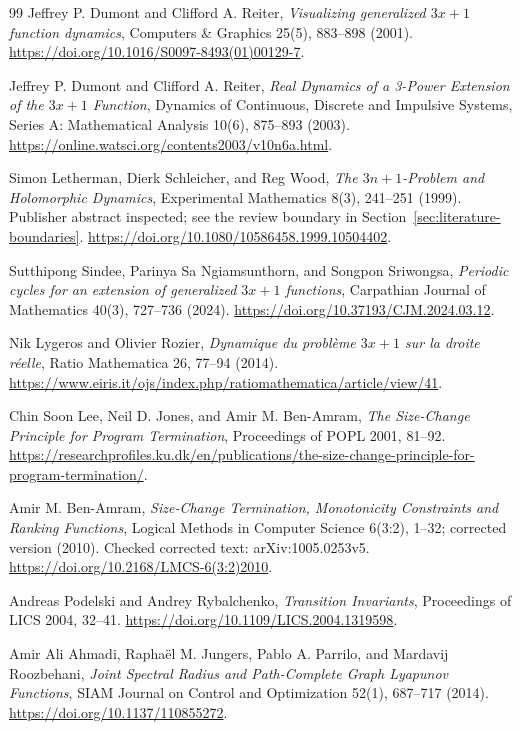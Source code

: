 \begin{thebibliography}{99}
Jeffrey P. Dumont and Clifford A. Reiter,
\emph{Visualizing generalized $3x+1$ function dynamics},
Computers \& Graphics 25(5), 883--898 (2001).
\url{https://doi.org/10.1016/S0097-8493(01)00129-7}.

Jeffrey P. Dumont and Clifford A. Reiter,
\emph{Real Dynamics of a 3-Power Extension of the $3x+1$ Function},
Dynamics of Continuous, Discrete and Impulsive Systems, Series A: Mathematical Analysis 10(6), 875--893 (2003).
\url{https://online.watsci.org/contents2003/v10n6a.html}.

Simon Letherman, Dierk Schleicher, and Reg Wood,
\emph{The $3n+1$-Problem and Holomorphic Dynamics},
Experimental Mathematics 8(3), 241--251 (1999). Publisher abstract inspected; see the review boundary in Section~\ref{sec:literature-boundaries}.
\url{https://doi.org/10.1080/10586458.1999.10504402}.

Sutthipong Sindee, Parinya Sa Ngiamsunthorn, and Songpon Sriwongsa,
\emph{Periodic cycles for an extension of generalized $3x+1$ functions},
Carpathian Journal of Mathematics 40(3), 727--736 (2024).
\url{https://doi.org/10.37193/CJM.2024.03.12}.

Nik Lygeros and Olivier Rozier,
\emph{Dynamique du problème $3x+1$ sur la droite r\'{e}elle},
Ratio Mathematica 26, 77--94 (2014).
\url{https://www.eiris.it/ojs/index.php/ratiomathematica/article/view/41}.

Chin Soon Lee, Neil D. Jones, and Amir M. Ben-Amram,
\emph{The Size-Change Principle for Program Termination},
Proceedings of POPL 2001, 81--92.
\url{https://researchprofiles.ku.dk/en/publications/the-size-change-principle-for-program-termination/}.

Amir M. Ben-Amram,
\emph{Size-Change Termination, Monotonicity Constraints and Ranking Functions},
Logical Methods in Computer Science 6(3:2), 1--32; corrected version (2010). Checked corrected text: arXiv:1005.0253v5.
\url{https://doi.org/10.2168/LMCS-6(3:2)2010}.

Andreas Podelski and Andrey Rybalchenko,
\emph{Transition Invariants},
Proceedings of LICS 2004, 32--41.
\url{https://doi.org/10.1109/LICS.2004.1319598}.

Amir Ali Ahmadi, Rapha\"{e}l M. Jungers, Pablo A. Parrilo, and Mardavij Roozbehani,
\emph{Joint Spectral Radius and Path-Complete Graph Lyapunov Functions},
SIAM Journal on Control and Optimization 52(1), 687--717 (2014).
\url{https://doi.org/10.1137/110855272}.


\end{thebibliography}
